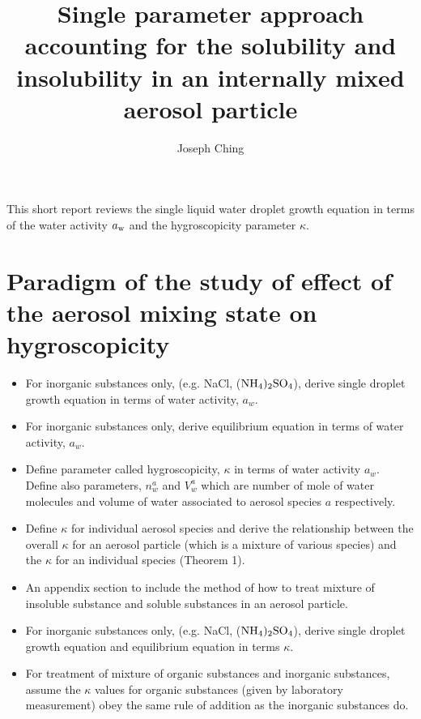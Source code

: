 \documentclass[12pt]{article}
\title{Single parameter approach accounting for the solubility and insolubility in an internally mixed aerosol particle}
\author{Joseph Ching}
\begin{document}
\maketitle
\tableofcontents


This short report reviews the single liquid water droplet growth equation in terms of the 
water activity $a_{\rm w}$ and the hygroscopicity parameter $\kappa$. 

 

\section{Paradigm of the study of effect of the aerosol mixing state on hygroscopicity}

\begin{itemize}

\item For inorganic substances only, (e.g. NaCl, ($ \rm NH_{4})_{2} \rm SO_{4}$), derive single droplet growth equation in terms of water activity, $a_{w}$.

\item For inorganic substances only, derive equilibrium equation in terms of water activity, $a_{w}$.

\item Define parameter called hygroscopicity, $\kappa$ in terms of water activity $a_{w}$. Define also parameters, $n_{w}^{a}$ and $V_{w}^{a}$ which are number of mole of water molecules and volume of water associated to aerosol species $a$ respectively. 

\item Define $\kappa$ for individual aerosol species and derive the relationship between the overall $\kappa$ for an aerosol particle (which is a mixture of various species) and the $\kappa$ for an individual species (Theorem 1). 

\item An appendix section to include the method of how to treat mixture of insoluble substance and soluble substances in an aerosol particle.

\item For inorganic substances only, (e.g. NaCl, ($ \rm NH_{4})_{2} \rm SO_{4}$), derive single droplet growth equation and equilibrium equation in terms $\kappa$.

\item For treatment of mixture of organic substances and inorganic substances, assume the $\kappa$ values for organic substances (given by laboratory measurement) obey the same rule of addition as the inorganic substances do.

\end{itemize}
\end{document}
